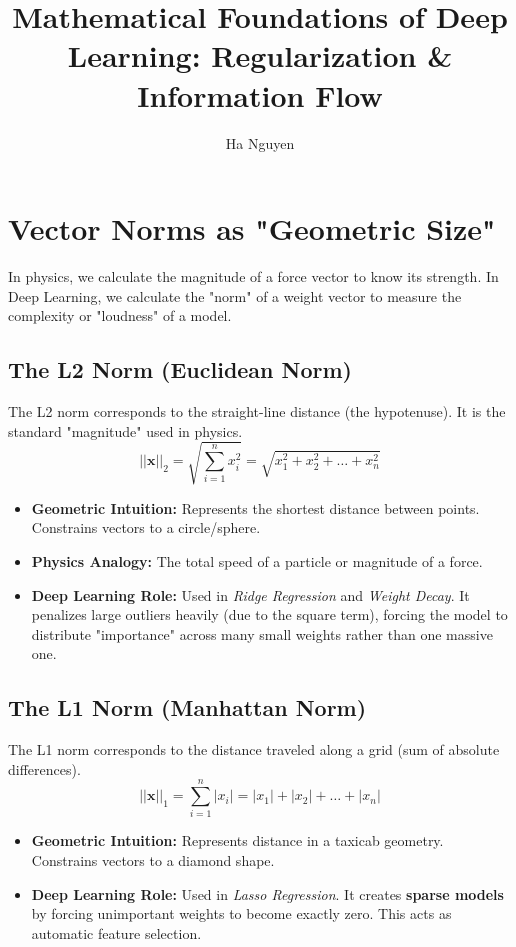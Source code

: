\documentclass{article}
\title{Mathematical Foundations of Deep Learning: Regularization \& Information Flow}
\author{Ha Nguyen}
\date{}
\begin{document}
\maketitle

\section{Vector Norms as "Geometric Size"}
In physics, we calculate the magnitude of a force vector to know its strength. In Deep Learning, we calculate the "norm" of a weight vector to measure the complexity or "loudness" of a model.

\subsection{The L2 Norm (Euclidean Norm)}
The L2 norm corresponds to the straight-line distance (the hypotenuse). It is the standard "magnitude" used in physics.
$$ ||\mathbf{x}||_2 = \sqrt{\sum_{i=1}^{n} x_i^2} = \sqrt{x_1^2 + x_2^2 + \dots + x_n^2} $$
\begin{itemize}
    \item \textbf{Geometric Intuition:} Represents the shortest distance between points. Constrains vectors to a circle/sphere.
    \item \textbf{Physics Analogy:} The total speed of a particle or magnitude of a force.
    \item \textbf{Deep Learning Role:} Used in \textit{Ridge Regression} and \textit{Weight Decay}. It penalizes large outliers heavily (due to the square term), forcing the model to distribute "importance" across many small weights rather than one massive one.
\end{itemize}

\subsection{The L1 Norm (Manhattan Norm)}
The L1 norm corresponds to the distance traveled along a grid (sum of absolute differences).
$$ ||\mathbf{x}||_1 = \sum_{i=1}^{n} |x_i| = |x_1| + |x_2| + \dots + |x_n| $$
\begin{itemize}
    \item \textbf{Geometric Intuition:} Represents distance in a taxicab geometry. Constrains vectors to a diamond shape.
    \item \textbf{Deep Learning Role:} Used in \textit{Lasso Regression}. It creates \textbf{sparse models} by forcing unimportant weights to become exactly zero. This acts as automatic feature selection.
\end{itemize}
\end{document}
